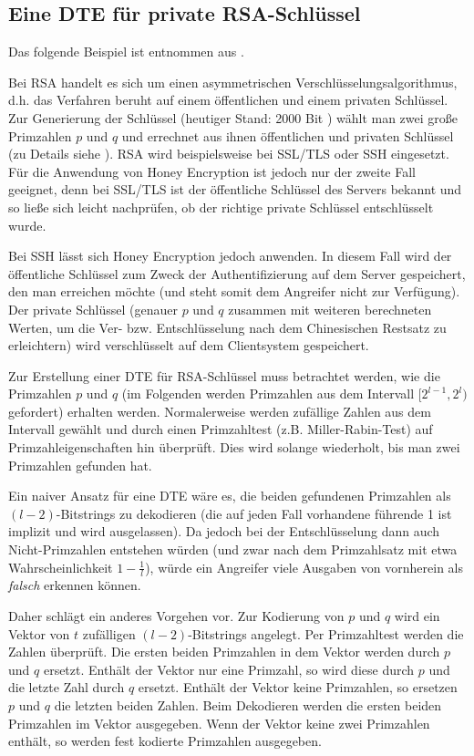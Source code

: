\subsection{Eine DTE für private RSA-Schlüssel}

Das folgende Beispiel ist entnommen aus \cite{EURO2014}.

Bei RSA handelt es sich um einen asymmetrischen Verschlüsselungsalgorithmus, d.h. das Verfahren beruht auf einem öffentlichen und einem privaten Schlüssel. Zur Generierung der Schlüssel (heutiger Stand: 2000 Bit \cite{BSI2014}) wählt man zwei große  Primzahlen \(p\) und \(q\) und errechnet aus ihnen öffentlichen und privaten Schlüssel (zu Details siehe \cite{Schneier2006}). RSA wird beispielsweise bei SSL/TLS oder SSH eingesetzt. Für die Anwendung von Honey Encryption ist jedoch nur der zweite Fall geeignet, denn bei SSL/TLS ist der öffentliche Schlüssel des Servers bekannt und so ließe sich leicht nachprüfen, ob der richtige private Schlüssel entschlüsselt wurde. 

Bei SSH lässt sich Honey Encryption jedoch anwenden. In diesem Fall wird der öffentliche Schlüssel zum Zweck der Authentifizierung auf dem Server gespeichert, den man erreichen möchte (und steht somit dem Angreifer nicht zur Verfügung). Der private Schlüssel (genauer \(p\) und \(q\) zusammen mit weiteren berechneten Werten, um die Ver- bzw. Entschlüsselung nach dem Chinesischen Restsatz zu erleichtern) wird verschlüsselt auf dem Clientsystem gespeichert.

Zur Erstellung einer DTE für RSA-Schlüssel muss betrachtet werden, wie die Primzahlen \(p\) und \(q\) (im Folgenden werden Primzahlen aus dem Intervall \([2^{l-1},2^l)\) gefordert) erhalten werden. Normalerweise werden zufällige Zahlen aus dem Intervall gewählt und durch einen Primzahltest (z.B. Miller-Rabin-Test) auf Primzahleigenschaften hin überprüft. Dies wird solange wiederholt, bis man zwei Primzahlen gefunden hat. 

Ein naiver Ansatz für eine DTE wäre es, die beiden gefundenen Primzahlen als \((l-2)\)-Bitstrings zu dekodieren (die auf jeden Fall vorhandene führende 1 ist implizit und wird ausgelassen). Da jedoch bei der Entschlüsselung dann auch Nicht-Primzahlen entstehen würden (und zwar nach dem Primzahlsatz mit etwa Wahrscheinlichkeit \(1-\frac{1}{l}\)), würde ein Angreifer viele Ausgaben von vornherein als \emph{falsch} erkennen können.

Daher schlägt \cite{EURO2014} ein anderes Vorgehen vor. Zur Kodierung von \(p\) und \(q\) wird ein Vektor von \(t\) zufälligen \((l-2)\)-Bitstrings angelegt. Per Primzahltest werden die Zahlen überprüft. Die ersten beiden Primzahlen in dem Vektor werden durch \(p\) und \(q\) ersetzt. Enthält der Vektor nur eine Primzahl, so wird diese durch \(p\) und die letzte Zahl durch \(q\) ersetzt. Enthält der Vektor keine Primzahlen, so ersetzen \(p\) und \(q\) die letzten beiden Zahlen. Beim Dekodieren werden die ersten beiden Primzahlen im Vektor ausgegeben. Wenn der Vektor keine zwei Primzahlen enthält, so werden fest kodierte Primzahlen ausgegeben.

